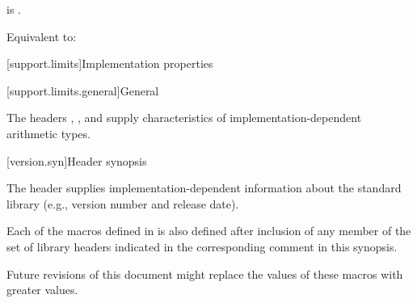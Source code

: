 \begin{itemdescr}
\pnum
\constraints
{} is .

\pnum
\effects
Equivalent to: 
\end{itemdescr}

[support.limits]{Implementation properties}

[support.limits.general]{General}

\pnum
The headers
,
, and
supply characteristics of
%
imple\-mentation-dependent
arithmetic types.

[version.syn]{Header  synopsis}

\pnum
The header 
supplies implementation-dependent information
about the \Cpp{} standard library
(e.g., version number and release date).

\pnum
{}%
Each of the macros defined in  is also defined
after inclusion of any member of the set of library headers
indicated in the corresponding comment in this synopsis.
\begin{note}
Future revisions of this document might replace
the values of these macros with greater values.
\end{note}

